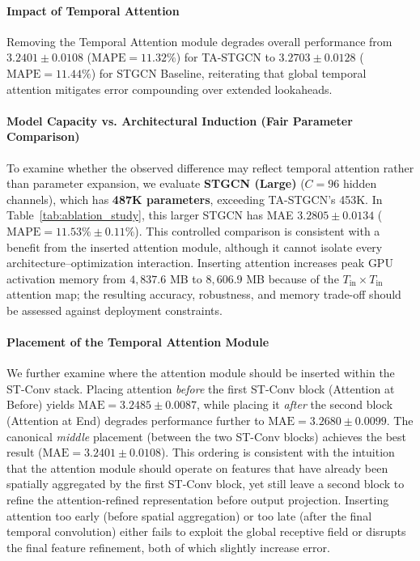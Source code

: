 \documentclass[journal,twocolumn]{IEEEtran}
\begin{document}
\paragraph{Impact of Temporal Attention} Removing the Temporal Attention module degrades overall performance from $3.2401 \pm 0.0108$ ($\text{MAPE} = 11.32\%$) for TA-STGCN to $3.2703 \pm 0.0128$ ($\text{MAPE} = 11.44\%$) for STGCN Baseline, reiterating that global temporal attention mitigates error compounding over extended lookaheads.

\paragraph{Model Capacity vs. Architectural Induction (Fair Parameter Comparison)} To examine whether the observed difference may reflect temporal attention rather than parameter expansion, we evaluate \textbf{STGCN (Large)} ($C=96$ hidden channels), which has \textbf{487K parameters}, exceeding TA-STGCN's 453K. In Table~\ref{tab:ablation_study}, this larger STGCN has MAE $3.2805 \pm 0.0134$ ($\text{MAPE} = 11.53\% \pm 0.11\%$). This controlled comparison is consistent with a benefit from the inserted attention module, although it cannot isolate every architecture--optimization interaction. Inserting attention increases peak GPU activation memory from $4,837.6$ MB to $8,606.9$ MB because of the $T_{\text{in}} \times T_{\text{in}}$ attention map; the resulting accuracy, robustness, and memory trade-off should be assessed against deployment constraints.

\paragraph{Placement of the Temporal Attention Module} We further examine where the attention module should be inserted within the ST-Conv stack. Placing attention \emph{before} the first ST-Conv block (Attention at Before) yields $\text{MAE} = 3.2485 \pm 0.0087$, while placing it \emph{after} the second block (Attention at End) degrades performance further to $\text{MAE} = 3.2680 \pm 0.0099$. The canonical \emph{middle} placement (between the two ST-Conv blocks) achieves the best result ($\text{MAE} = 3.2401 \pm 0.0108$). This ordering is consistent with the intuition that the attention module should operate on features that have already been spatially aggregated by the first ST-Conv block, yet still leave a second block to refine the attention-refined representation before output projection. Inserting attention too early (before spatial aggregation) or too late (after the final temporal convolution) either fails to exploit the global receptive field or disrupts the final feature refinement, both of which slightly increase error.
\end{document}
